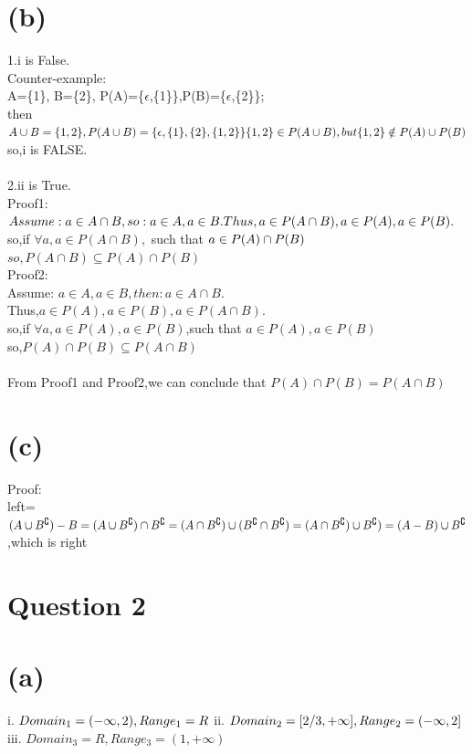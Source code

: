 \documentclass{article}
\begin{document}
\section*{(b)}
1.i is False.\\
Counter-example:\\
A=\{1\}, B=\{2\}, P(A)=\{$\epsilon$,\{1\}\},P(B)=\{$\epsilon$,\{2\}\};\\
then \(A\cup B=\{1,2\},P(A\cup B)=\{\epsilon, \{1\}, \{2\}, \{1,2\}\}\\\{1,2\}\in P(A\cup B),but\{1,2\}\notin P(A)\cup P(B)\)\\so,i is FALSE.\\
\\
2.ii is True.\\
Proof1:\\
\(Assume:a \in A\cap B,so:a\in A,a\in B.\\Thus,a\in P(A\cap B),a\in P(A),a\in P(B).\)\\so,if 
\(\forall a,a\in P(A\cap B),\) such that  \(a\in P(A)\cap P(B)\\\)
\(so,P(A\cap B) \subseteq P(A)\cap P(B) \)\\
Proof2:\\
Assume:
\(a\in A,a\in B,then:a\in A\cap B.\)\\Thus,\(a\in P(A),a\in P(B),a \in P(A\cap B).\)\\
so,if \(\forall a,a\in P(A),a\in P(B)\),such that \(a\in P(A),a\in P(B)\)\\so,\(P(A)\cap P(B)\subseteq P(A\cap B)\)\\
\\From Proof1 and Proof2,we can conclude that \(P(A)\cap P(B) = P(A\cap B)\)

\section*{(c)}
Proof:\\
left=\((A\cup B^\complement)-B=(A\cup B^\complement)\cap B^\complement=(A\cap B^\complement)\cup (B^\complement\cap B^\complement)\\
=(A\cap B^\complement)\cup B^\complement)\\
=(A-B)\cup B^\complement\),which is right 


\section*{Question 2}

\section*{(a)}
i.
\(Domain_1=(-\infty,2),Range_1=R\\\)
ii.
\(Domain_2=[2/3,+\infty],Range_2=(-\infty,2]\\\)
iii.
\(Domain_3=R,Range_3=(1,+\infty)\)
\end{document}
